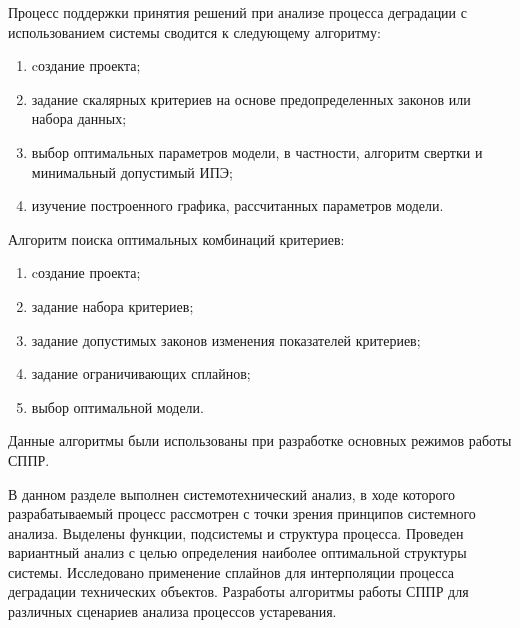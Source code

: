 
Процесс поддержки принятия решений при анализе процесса деградации с использованием системы сводится к следующему алгоритму:
\begin{enumerate}
  \item cоздание проекта;
  \item задание скалярных критериев на основе предопределенных законов или набора данных;
  \item выбор оптимальных параметров модели, в частности, алгоритм свертки и минимальный допустимый ИПЭ;
  \item изучение построенного графика, рассчитанных параметров модели.
\end{enumerate}

Алгоритм поиска оптимальных комбинаций критериев:
\begin{enumerate}
  \item cоздание проекта;
  \item задание набора критериев;
  \item задание допустимых законов изменения показателей критериев;
  \item задание ограничивающих сплайнов;
  \item выбор оптимальной модели.
\end{enumerate}

Данные алгоритмы были использованы при разработке основных режимов работы СППР.

В данном разделе выполнен системотехнический анализ, в ходе которого разрабатываемый процесс рассмотрен с точки зрения принципов системного анализа. 
Выделены функции, подсистемы и структура процесса. 
Проведен вариантный анализ с целью определения наиболее оптимальной структуры системы. 
Исследовано применение сплайнов для интерполяции процесса деградации технических объектов.
Разработы алгоритмы работы СППР для различных сценариев анализа процессов устаревания.




